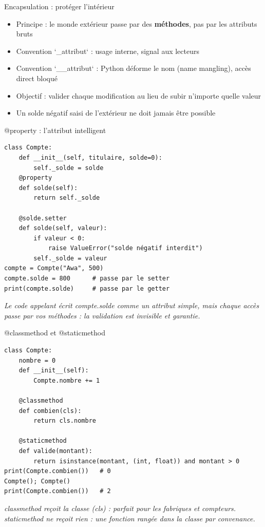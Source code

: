 \documentclass[aspectratio=169,11pt]{beamer}
\begin{document}
\begin{frame}{Encapsulation : protéger l'intérieur}
\begin{itemize}
  \item Principe : le monde extérieur passe par des \textbf{méthodes}, pas par les attributs bruts
  \item Convention `\_attribut` : usage interne, signal aux lecteurs
  \item Convention `\_\_attribut` : Python déforme le nom (name mangling), accès direct bloqué
  \item Objectif : valider chaque modification au lieu de subir n'importe quelle valeur
  \item Un solde négatif saisi de l'extérieur ne doit jamais être possible
\end{itemize}
\end{frame}

\begin{frame}[fragile]{@property : l'attribut intelligent}

\begin{lstlisting}[style=py]
class Compte:
    def __init__(self, titulaire, solde=0):
        self._solde = solde
    @property
    def solde(self):
        return self._solde

    @solde.setter
    def solde(self, valeur):
        if valeur < 0:
            raise ValueError("solde négatif interdit")
        self._solde = valeur
compte = Compte("Awa", 500)
compte.solde = 800      # passe par le setter
print(compte.solde)     # passe par le getter
\end{lstlisting}
\vspace{0.5pt}

{\small\color{PyGris}\itshape Le code appelant écrit compte.solde comme un attribut simple, mais chaque accès passe par vos méthodes : la validation est invisible et garantie.}

\end{frame}

\begin{frame}[fragile]{@classmethod et @staticmethod}

\begin{lstlisting}[style=py]
class Compte:
    nombre = 0
    def __init__(self):
        Compte.nombre += 1

    @classmethod
    def combien(cls):
        return cls.nombre

    @staticmethod
    def valide(montant):
        return isinstance(montant, (int, float)) and montant > 0
print(Compte.combien())   # 0
Compte(); Compte()
print(Compte.combien())   # 2
\end{lstlisting}
\vspace{0.5pt}

{\small\color{PyGris}\itshape classmethod reçoit la classe (cls) : parfait pour les fabriques et compteurs. staticmethod ne reçoit rien : une fonction rangée dans la classe par convenance.}

\end{frame}
\end{document}
